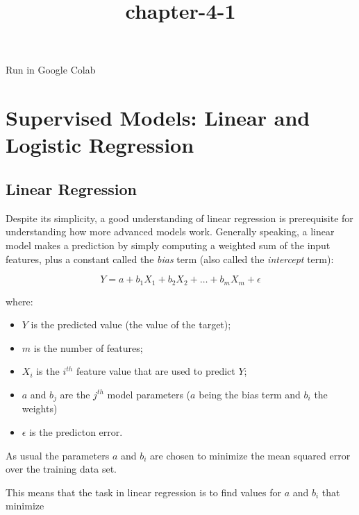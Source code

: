 \documentclass[11pt]{article}
\title{chapter-4-1}
\providecommand{\tightlist}{%
      \setlength{\itemsep}{0pt}\setlength{\parskip}{0pt}}
\begin{document}
    
    \maketitle
    
    

    
    Run in Google Colab

    \hypertarget{supervised-models-linear-and-logistic-regression}{%
\section{Supervised Models: Linear and Logistic
Regression}\label{supervised-models-linear-and-logistic-regression}}

    \hypertarget{linear-regression}{%
\subsection{Linear Regression}\label{linear-regression}}

    Despite its simplicity, a good understanding of linear regression is
prerequisite for understanding how more advanced models work. Generally
speaking, a linear model makes a prediction by simply computing a
weighted sum of the input features, plus a constant called the
\emph{bias} term (also called the \emph{intercept} term):

\begin{equation}
Y = a + b_1 X_1 + b_2 X_2 + \dots + b_m X_m + \epsilon
\end{equation}

where:

\begin{itemize}
\tightlist
\item
  \(Y\) is the predicted value (the value of the target);
\item
  \(m\) is the number of features;
\item
  \(X_i\) is the \(i^{th}\) feature value that are used to predict
  \(Y\);
\item
  \(a\) and \(b_j\) are the \(j^{th}\) model parameters (\(a\) being the
  bias term and \(b_i\) the weights)
\item
  \(\epsilon\) is the predicton error.
\end{itemize}

As usual the parameters \(a\) and \(b_i\) are chosen to minimize the
mean squared error over the training data set.

This means that the task in linear regression is to find values for
\(a\) and \(b_i\) that minimize
\end{document}

